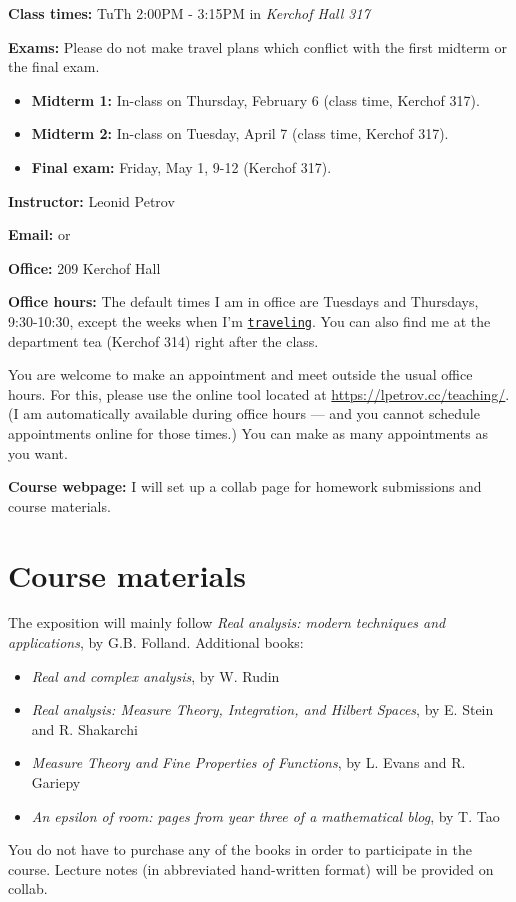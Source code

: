 \documentclass[oneside,11pt]{amsart}
\begin{document}
\textbf{Class times:}   TuTh 2:00PM - 3:15PM in
\emph{Kerchof Hall 317}

\medskip


\textbf{Exams:} Please do not make travel plans which conflict
with the first midterm or the final exam.
\begin{itemize}
	\item \textbf{Midterm 1:} In-class on Thursday, February 6 (class time, Kerchof 317).
	\item \textbf{Midterm 2:} In-class on Tuesday, April 7 (class time, Kerchof 317).
	\item \textbf{Final exam:} Friday, May 1, 9-12 (Kerchof 317).
\end{itemize}

\medskip

\textbf{Instructor:} Leonid Petrov
\medskip

\textbf{Email:}  or 
\medskip

\textbf{Office:} 209 Kerchof Hall
\medskip

\textbf{Office hours:}
The default times I am in office are Tuesdays and Thursdays, 9:30-10:30,
except the weeks when I'm \href{https://lpetrov.cc/2019/05/travel-2020/}{\texttt{traveling}}.
You can also find me at the department tea (Kerchof 314) right after the class.

You are welcome to make an appointment and meet outside the usual office hours. 
For this, please use the online tool located at
\url{https://lpetrov.cc/teaching/}. (I am automatically available during office hours --- 
and you cannot schedule appointments online for those times.)
You can make as 
many appointments as you want.

\medskip

\textbf{Course webpage:}
I will set up a collab page for homework submissions and course materials.

\section{Course materials}

The exposition will mainly follow 
\emph{Real analysis: modern techniques and applications}, by G.B. Folland.
Additional books:
\begin{itemize}
	\item \emph{Real and complex analysis}, by W. Rudin
	\item \emph{Real analysis: Measure Theory, Integration, and Hilbert Spaces},
		by E. Stein and R. Shakarchi
	\item \emph{Measure Theory and Fine Properties of Functions},
		by L. Evans and R. Gariepy
	\item \emph{An epsilon of room: pages from year three of a mathematical blog},
		by T. Tao
\end{itemize}
You do not have to purchase any of the books in order to 
participate in the course.
Lecture notes (in abbreviated hand-written format)
will be provided on collab.
\end{document}
